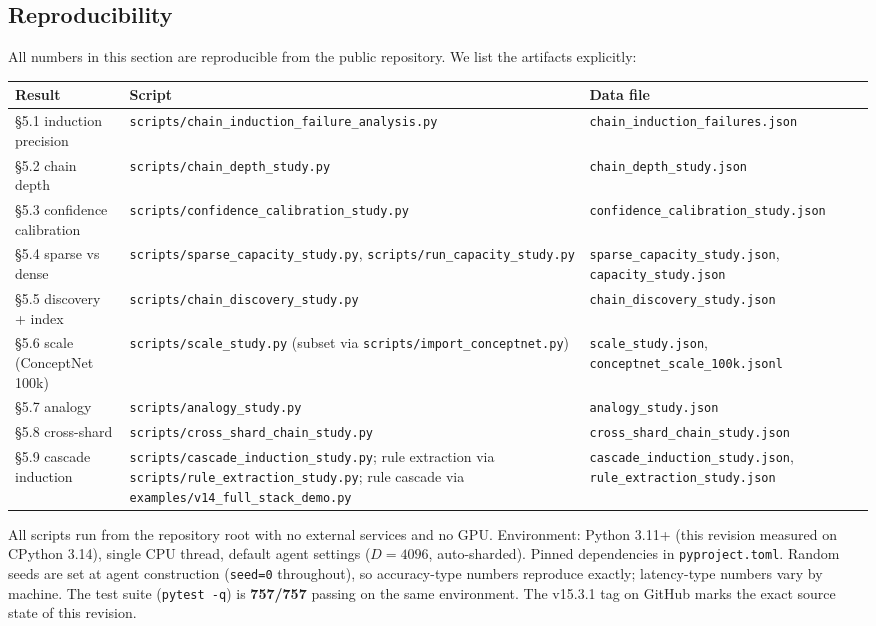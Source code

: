 \documentclass[11pt]{article}
\begin{document}
\subsection{Reproducibility}

All numbers in this section are reproducible from the public
repository. We list the artifacts explicitly:

\begin{center}
\small
\begin{tabular}{p{} p{} p{}}
\toprule
Result & Script & Data file \\
\midrule
\S 5.1 induction precision &
\texttt{scripts/chain\_induction\_failure\_analysis.py} &
\texttt{chain\_induction\_failures.json} \\
\S 5.2 chain depth &
\texttt{scripts/chain\_depth\_study.py} &
\texttt{chain\_depth\_study.json} \\
\S 5.3 confidence calibration &
\texttt{scripts/confidence\_calibration\_study.py} &
\texttt{confidence\_calibration\_study.json} \\
\S 5.4 sparse vs dense &
\texttt{scripts/sparse\_capacity\_study.py},
\texttt{scripts/run\_capacity\_study.py} &
\texttt{sparse\_capacity\_study.json},
\texttt{capacity\_study.json} \\
\S 5.5 discovery + index &
\texttt{scripts/chain\_discovery\_study.py} &
\texttt{chain\_discovery\_study.json} \\
\S 5.6 scale (ConceptNet 100k) &
\texttt{scripts/scale\_study.py}
(subset via \texttt{scripts/import\_conceptnet.py}) &
\texttt{scale\_study.json},
\texttt{conceptnet\_scale\_100k.jsonl} \\
\S 5.7 analogy &
\texttt{scripts/analogy\_study.py} &
\texttt{analogy\_study.json} \\
\S 5.8 cross-shard &
\texttt{scripts/cross\_shard\_chain\_study.py} &
\texttt{cross\_shard\_chain\_study.json} \\
\S 5.9 cascade induction &
\texttt{scripts/cascade\_induction\_study.py};
rule extraction via \texttt{scripts/rule\_extraction\_study.py};
rule cascade via \texttt{examples/v14\_full\_stack\_demo.py} &
\texttt{cascade\_induction\_study.json},
\texttt{rule\_extraction\_study.json} \\
\bottomrule
\end{tabular}
\end{center}

All scripts run from the repository root with no external services
and no GPU. Environment: Python 3.11+ (this revision measured on
CPython 3.14), single CPU thread, default agent settings
($D = 4096$, auto-sharded). Pinned dependencies in
\texttt{pyproject.toml}. Random seeds are set at agent construction
(\texttt{seed=0} throughout), so accuracy-type numbers reproduce
exactly; latency-type numbers vary by machine. The test suite
(\texttt{pytest -q}) is \textbf{757/757} passing on the same
environment. The v15.3.1 tag on GitHub marks the exact source state
of this revision.
\end{document}
